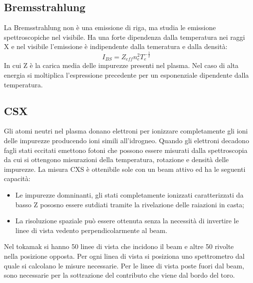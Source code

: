 \documentclass{article}
\begin{document}
\subsection{Bremsstrahlung}
La Bremsstrahlung non è una emissione di riga, ma studia le emissione spettroscopiche nel visibile. Ha una forte dipendenza dalla temperatura nei raggi X e nel visibile l'emissione è indipendente dalla temeratura e dalla densità:
\begin{equation*}
	I_{BS}=Z_{eff}n_{e}^{2}T_{e}^{-\frac{1}{2}}
\end{equation*}
In cui Z è la carica media delle impurezze presenti nel plasma.
Nel caso di alta energia si moltiplica l'espressione precedente per un esponenziale dipendente dalla temperatura.\newline
\subsection{CSX}
Gli atomi neutri nel plasma donano elettroni per ionizzare completamente gli ioni delle impurezze producendo ioni simili all'idrogneo. Quando gli elettroni decadono fagli stati eccitati emettono fotoni che possono essere misurati dalla spettroscopia da cui si ottengono misurazioni della temperatura, rotazione e densità delle impurezze.
La misura CXS è ottenibile sole con un beam attivo ed ha le seguenti capacità:\begin{itemize}
	\item Le impurezze domninanti, gli stati completamente ionizzati caratterizzati da basso Z pososno essere sutdiati tramite la rivelazione delle raiazioni in casta;
	\item La risoluzione spaziale può essere ottenuta senza la necessità di invertire le linee di vista vedento perpendicolarmente al beam.
\end{itemize}
Nel tokamak si hanno 50 linee di vista che incidono il beam e altre 50 rivolte nella posizione opposta. Per ogni linea di vista si posiziona uno spettrometro dal quale si calcolano le misure necessarie. Per le linee di vista poste fuori dal beam, sono necessarie per la sottrazione del contributo che viene dal bordo del toro.
\end{document}
